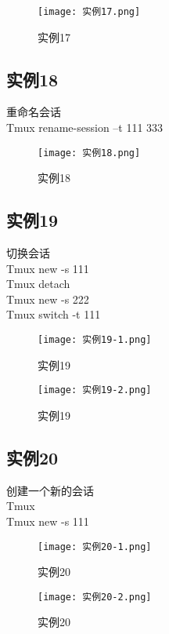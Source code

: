 \documentclass[a4paper, 12pt]{article}
\begin{document}
\begin{figure}[h!]
  \centering
  \texttt{[image: 实例17.png]}
  \caption{实例17}
\end{figure}

\subsection{实例18}
重命名会话\\
Tmux rename-session –t 111 333\\

\begin{figure}[h!]
  \centering
  \texttt{[image: 实例18.png]}
  \caption{实例18}
\end{figure}

\subsection{实例19}
切换会话\\
Tmux new -s 111\\
Tmux detach\\
Tmux new -s 222\\
Tmux switch -t 111\\

\begin{figure}[h!]
  \centering
  \texttt{[image: 实例19-1.png]}
  \caption{实例19}
\end{figure}

\begin{figure}[h!]
  \centering
  \texttt{[image: 实例19-2.png]}
  \caption{实例19}
\end{figure}

\subsection{实例20}
创建一个新的会话\\
Tmux\\
Tmux new -s 111\\

\begin{figure}[h!]
  \centering
  \texttt{[image: 实例20-1.png]}
  \caption{实例20}
\end{figure}

\begin{figure}[h!]
  \centering
  \texttt{[image: 实例20-2.png]}
  \caption{实例20}
\end{figure}
\end{document}
